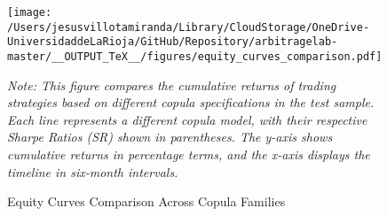\begin{figure}[H]
  \caption{Equity Curves Comparison Across Copula Families}
  \centering
  \texttt{[image: /Users/jesusvillotamiranda/Library/CloudStorage/OneDrive-UniversidaddeLaRioja/GitHub/Repository/arbitragelab-master/\_\_OUTPUT\_TeX\_\_/figures/equity\_curves\_comparison.pdf]}
  \label{fig:equity_curves_comparison}
\vspace{0.5cm}
\begin{minipage}{\textwidth}
\setlength{\parindent}{0pt}
\small\textit{Note: 
This figure compares the cumulative returns of trading strategies based on different copula specifications in the test sample. Each line represents a different copula model, with their respective Sharpe Ratios (SR) shown in parentheses. The y-axis shows cumulative returns in percentage terms, and the x-axis displays the timeline in six-month intervals.
}
\end{minipage}

\end{figure}